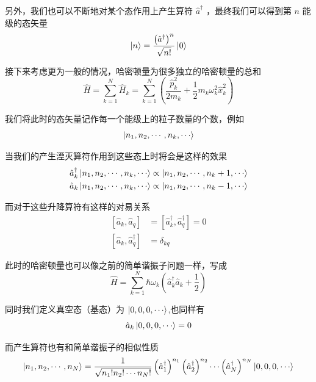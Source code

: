 \documentclass{article}
\begin{document}
另外，我们也可以不断地对某个态作用上产生算符 $\hat{a}^\dagger$ ，最终我们可以得到第 $n$ 能级的态矢量
\begin{equation*}
    \ket{n} = \frac{\left(\hat{a}^\dagger\right)^n}{\sqrt{n!}}\ket{0}
\end{equation*}

接下来考虑更为一般的情况，哈密顿量为很多独立的哈密顿量的总和
\begin{equation*}
    \hat{H} = \sum_{k = 1}^{N} \hat{H}_k =\sum_{k = 1}^{N} \left(\frac{\hat{p}_k^2}{2m_k} + \frac{1}{2} m_k \omega_k^2 \hat{x}_k^2\right)
\end{equation*}

我们将此时的态矢量记作每一个能级上的粒子数量的个数，例如
\begin{equation*}
    \ket{n_1,n_2,\cdots,n_k,\cdots}
\end{equation*}

当我们的产生湮灭算符作用到这些态上时将会是这样的效果
\begin{align*}
    \hat{a}_k^\dagger \ket{n_1,n_2,\cdots,n_k,\cdots} &\propto \ket{n_1,n_2,\cdots,n_k + 1,\cdots} \\
    \hat{a}_k \ket{n_1,n_2,\cdots,n_k,\cdots} &\propto \ket{n_1,n_2,\cdots,n_k - 1,\cdots}
\end{align*}

而对于这些升降算符有这样的对易关系
\begin{align*}
    \left[\hat{a}_k,\hat{a}_q\right] &= \left[\hat{a}_k^\dagger,\hat{a}_q^\dagger\right] = 0 \\
    \left[\hat{a}_k,\hat{a}_q^\dagger\right] &= \delta _{kq}
\end{align*}

此时的哈密顿量也可以像之前的简单谐振子问题一样，写成
\begin{equation*}
    \hat{H} = \sum_{k=1}^{N} \hbar\omega_k \left(\hat{a}_k^\dagger \hat{a}_k + \frac{1}{2}\right)
\end{equation*}

同时我们定义真空态（基态）为 $\displaystyle \ket{0,0,0,\cdots}$,也同样有
\begin{equation*}
    \hat{a}_k \ket{0,0,0,\cdots} = 0
\end{equation*}

而产生算符也有和简单谐振子的相似性质
\begin{equation*}
    \ket{n_1,n_2,\cdots,n_N} = \frac{1}{\sqrt{n_1! n_2! \cdots n_N!}}\left(\hat{a}_1^\dagger\right)^{n_1}\left(\hat{a}_2^\dagger\right)^{n_2}\cdots\left(\hat{a}_N^\dagger\right)^{n_N} \ket{0,0,0,\cdots}
\end{equation*}
\end{document}
